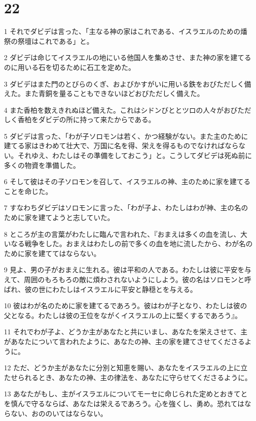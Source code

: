 \chapter{22}

\par 1 それでダビデは言った、「主なる神の家はこれである、イスラエルのための燔祭の祭壇はこれである」と。
\par 2 ダビデは命じてイスラエルの地にいる他国人を集めさせ、また神の家を建てるのに用いる石を切るために石工を定めた。
\par 3 ダビデはまた門のとびらのくぎ、およびかすがいに用いる鉄をおびただしく備えた。また青銅を量ることもできないほどおびただしく備えた。
\par 4 また香柏を数えきれぬほど備えた。これはシドンびととツロの人々がおびただしく香柏をダビデの所に持って来たからである。
\par 5 ダビデは言った、「わが子ソロモンは若く、かつ経験がない。また主のために建てる家はきわめて壮大で、万国に名を得、栄えを得るものでなければならない。それゆえ、わたしはその準備をしておこう」と。こうしてダビデは死ぬ前に多くの物資を準備した。
\par 6 そして彼はその子ソロモンを召して、イスラエルの神、主のために家を建てることを命じた。
\par 7 すなわちダビデはソロモンに言った、「わが子よ、わたしはわが神、主の名のために家を建てようと志していた。
\par 8 ところが主の言葉がわたしに臨んで言われた、『おまえは多くの血を流し、大いなる戦争をした。おまえはわたしの前で多くの血を地に流したから、わが名のために家を建ててはならない。
\par 9 見よ、男の子がおまえに生れる。彼は平和の人である。わたしは彼に平安を与えて、周囲のもろもろの敵に煩わされないようにしよう。彼の名はソロモンと呼ばれ、彼の世にわたしはイスラエルに平安と静穏とを与える。
\par 10 彼はわが名のために家を建てるであろう。彼はわが子となり、わたしは彼の父となる。わたしは彼の王位をながくイスラエルの上に堅くするであろう』。
\par 11 それでわが子よ、どうか主があなたと共にいまし、あなたを栄えさせて、主があなたについて言われたように、あなたの神、主の家を建てさせてくださるように。
\par 12 ただ、どうか主があなたに分別と知恵を賜い、あなたをイスラエルの上に立たせられるとき、あなたの神、主の律法を、あなたに守らせてくださるように。
\par 13 あなたがもし、主がイスラエルについてモーセに命じられた定めとおきてとを慎んで守るならば、あなたは栄えるであろう。心を強くし、勇め。恐れてはならない、おののいてはならない。
